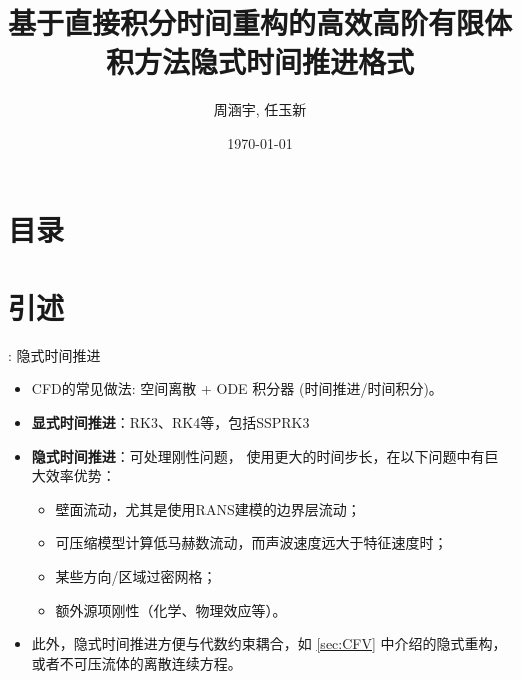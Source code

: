 \documentclass[aspectratio=169,serif]{beamer} %
\title[DITR]{基于直接积分时间重构的高效高阶有限体积方法隐式时间推进格式}
\author[周涵宇, 任玉新]{周涵宇, 任玉新}
\institute[清华大学]{\small  清华大学}
\date{\small \vskip -10pt \today}
\begin{document}


\begin{frame}
  \maketitle
\end{frame}

\section*{目录}
\frame{
  \frametitle{\secname}
  \tableofcontents[hideallsubsections]
}

\section{引述}


\begin{frame}{\secname: 隐式时间推进}
  \begin{itemize}
    \item  CFD的常见做法:
          空间离散 + ODE 积分器
          (时间推进/时间积分)。
    \item {\bf 显式时间推进}：RK3、RK4等，包括SSPRK3
    \item {\bf 隐式时间推进}：可处理刚性问题，
          使用更大的时间步长，在以下问题中有巨大效率优势：
          \begin{itemize}
            \item 壁面流动，尤其是使用RANS建模的边界层流动；
            \item 可压缩模型计算低马赫数流动，而声波速度远大于特征速度时；
            \item 某些方向/区域过密网格；
            \item 额外源项刚性（化学、物理效应等）。
          \end{itemize}
    \item 此外，隐式时间推进方便与代数约束耦合，如 \ref{sec:CFV} 中介绍的隐式重构，
          或者不可压流体的离散连续方程。
  \end{itemize}
\end{frame}
\end{document}
